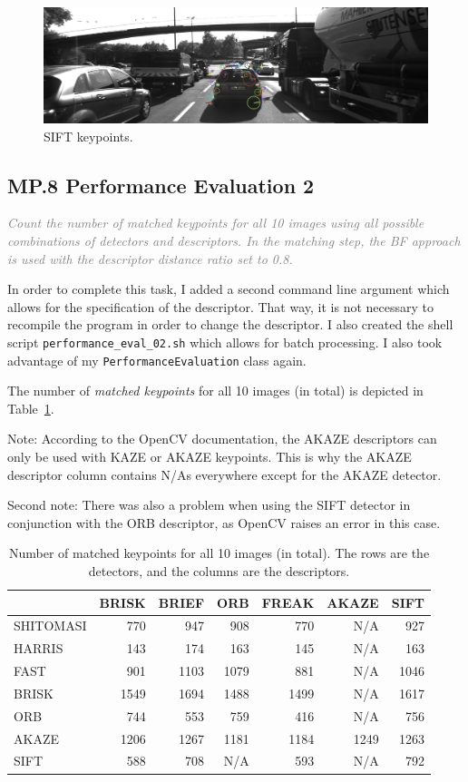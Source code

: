 \documentclass[a4paper]{scrartcl}
\begin{document}
\begin{figure}
	\centering
	\includegraphics[width=0.8\columnwidth]{./keypoints/SIFT}
	\caption{SIFT keypoints.}
	\label{fig:sift_keypoints}
\end{figure}

\subsection*{MP.8 Performance Evaluation 2}
\textcolor{gray}{\textit{Count the number of matched keypoints for all 10 images using all possible combinations of detectors and descriptors. In the matching step, the BF approach is used with the descriptor distance ratio set to 0.8.}}

In order to complete this task, I added a second command line argument which allows for the
specification of the descriptor. That way, it is not necessary to recompile the program
in order to change the descriptor.
I also created the shell script \texttt{performance\_eval\_02.sh} which allows for
batch processing.
I also took advantage of my \texttt{PerformanceEvaluation} class again.

The number of \emph{matched keypoints} for all 10 images (in total)
is depicted in Table~\ref{tab:performance_2}.

Note: According to the OpenCV documentation,
the AKAZE descriptors can only be used with KAZE or AKAZE keypoints.
This is why the AKAZE descriptor column contains N/As everywhere except
for the AKAZE detector.

Second note: There was also a problem when using the SIFT detector
in conjunction with the ORB descriptor, as OpenCV raises an error in this case.


\begin{table}
	\caption{Number of matched keypoints for all 10 images (in total).
		The rows are the detectors, and the columns are the descriptors.}
	\label{tab:performance_2}
	\begin{tabular}{l||r|r|r|r|r|r}
		 			& BRISK & BRIEF & ORB & FREAK & AKAZE & SIFT	\\
		\hline \hline
		SHITOMASI 	& 770 & 947 & 908 & 770 & N/A & 927 \\
		HARRIS 		& 143 & 174 & 163 & 145 & N/A & 163 \\
		FAST 		& 901 & 1103 & 1079 & 881 & N/A & 1046 \\
		BRISK 		& 1549 & 1694 & 1488 & 1499 & N/A & 1617 \\
		ORB 			& 744 & 553 & 759 & 416 & N/A & 756 \\
		AKAZE 		& 1206 & 1267 & 1181 & 1184 & 1249 & 1263 \\
		SIFT 		& 588 & 708 & N/A & 593 & N/A & 792 \\
		\hline
	\end{tabular}
\end{table}
\end{document}
